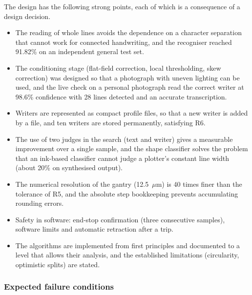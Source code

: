         The design has the following strong points, each of which is a consequence of a design decision.
        \begin{itemize}
          \item The reading of whole lines avoids the dependence on a character separation that cannot work for connected handwriting, and the recogniser reached 91.82\% on an independent general test set.
          \item The conditioning stage (flat-field correction, local thresholding, skew correction) was designed so that a photograph with uneven lighting can be used, and the live check on a personal photograph read the correct writer at 98.6\% confidence with 28 lines detected and an accurate transcription.
          \item Writers are represented as compact profile files, so that a new writer is added by a file, and ten writers are stored permanently, satisfying R6.
          \item The use of two judges in the search (text and writer) gives a measurable improvement over a single sample, and the shape classifier solves the problem that an ink-based classifier cannot judge a plotter's constant line width (about 20\% on synthesised output).
          \item The numerical resolution of the gantry (12.5~$\mu$m) is 40 times finer than the tolerance of R5, and the absolute step bookkeeping prevents accumulating rounding errors.
          \item Safety in software: end-stop confirmation (three consecutive samples), software limits and automatic retraction after a trip.
          \item The algorithms are implemented from first principles and documented to a level that allows their analysis, and the established limitations (circularity, optimistic splits) are stated.
        \end{itemize}

    \subsubsection{Expected failure conditions}
    \label{sec:dis-failure}

